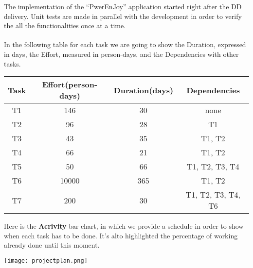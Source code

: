 The implementation of the ``PwerEnJoy'' application started right after the DD delivery. Unit tests are made in parallel with the development in order to verify the all the functionalities once at a time. \\
\\
In the following table for each task we are going to show the Duration, expressed in days, the Effort, measured in person-days, and the Dependencies with other tasks.
\begin{center}
	\begin{tabular}{c c c c}
		\hline
		\textbf{Task} & \textbf{Effort(person-days)} & \textbf{Duration(days)} & \textbf{Dependencies} \\
		\hline
		T1 & 146 & 30 & none \\
		T2 & 96 & 28 & T1 \\
		T3 & 43 & 35 & T1, T2 \\
		T4 & 66 & 21 & T1, T2 \\
		T5 & 50 & 66 & T1, T2, T3, T4 \\
		T6 & 10000 & 365 & T1, T2 \\
		T7 & 200 & 30 & T1, T2, T3, T4, T6  \\
		\hline
	\end{tabular}
\end{center}

\pagebreak
Here is the \textbf{Acrivity} bar chart, in which we provide a schedule in order to show when each task has to be done. It's alto highlighted the percentage of working already done until this moment.  
\begin{center}
	\texttt{[image: projectplan.png]}
\end{center}

